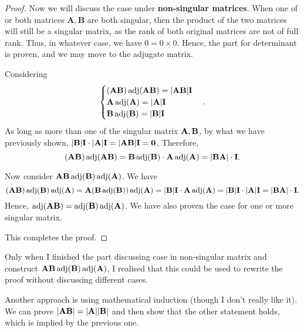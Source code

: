 \documentclass[12pt,a4paper]{article}
\begin{document}
\begin{proof}
    Now we will discuss the case under \textbf{non-singular matrices}.
    When one of or both matrices $\mathbf{A,B}$ are both singular, then the product of the two matrices will still be a singular matrix, as the rank of both original matrices are not of full rank. Thus, in whatever case, we have $0 = 0 \times0$. Hence, the part for determinant is proven, and we may move to the adjugate matrix.

    Considering
    $$
    \begin{cases}
        (\mathbf{A}\mathbf{B})\operatorname{adj}(\mathbf{A}\mathbf{B}) = |\mathbf{A}\mathbf{B}|\mathbf{I}\\
        \mathbf{A} \operatorname{adj}(\mathbf{A}) = |\mathbf{A}|\mathbf{I}\\
        \mathbf{B} \operatorname{adj}(\mathbf{B}) = |\mathbf{B}|\mathbf{I}
    \end{cases}.
    $$
    As long as more than one of the singular matrix $\mathbf{A,B}$, by what we have previously shown, $|\mathbf{B}|\mathbf{I} \cdot |\mathbf{A}|\mathbf{I} = |\mathbf{A}\mathbf{B}|\mathbf{I} = \mathbf{0}$. Therefore,
    \[
    (\mathbf{A}\mathbf{B})\operatorname{adj}(\mathbf{A}\mathbf{B}) = \mathbf{B} \operatorname{adj}(\mathbf{B}) \cdot \mathbf{A} \operatorname{adj}(\mathbf{A}) = |\mathbf{BA}|\cdot \mathbf{I}.
    \]

    Now consider $\mathbf{A}\mathbf{B}\operatorname{adj}(\mathbf{B})\operatorname{adj}(\mathbf{A})$.
    We have
    \[
    (\mathbf{A}\mathbf{B})\operatorname{adj}(\mathbf{B})\operatorname{adj}(\mathbf{A}) = \mathbf{A}(\mathbf{B}\operatorname{adj}(\mathbf{B}))\operatorname{adj}(\mathbf{A})
    =
    |\mathbf{B}|\mathbf{I}\cdot \mathbf{A}\operatorname{adj}(\mathbf{A}) = |\mathbf{B}|\mathbf{I}\cdot |\mathbf{A}|\mathbf{I} = |\mathbf{BA}|\cdot \mathbf{I}.
    \]
    Hence, $\operatorname{adj}(\mathbf{A}\mathbf{B}) = \operatorname{adj}(\mathbf{B})\operatorname{adj}(\mathbf{A})$.  We have also proven the case for one or more singular matrix.

    This completes the proof.
\end{proof}
\begin{remark}
    Only when I finished the part discussing case in non-singular matrix and construct $\mathbf{A}\mathbf{B}\operatorname{adj}(\mathbf{B})\operatorname{adj}(\mathbf{A})$, I realised that this could be used to rewrite the proof without discussing different cases.
\end{remark}
Another approach is using mathematical induction (though I don't really like it). We can prove $|\mathbf{AB}| = |\mathbf{A}||\mathbf{B}|$ and then show that the other statement holds, which is implied by the previous one.
\end{document}
